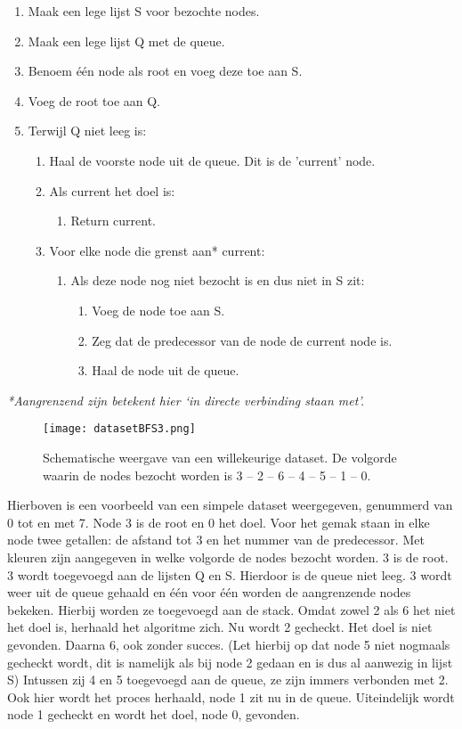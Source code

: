 \begin{enumerate}
\item Maak een lege lijst S voor bezochte nodes.
\item Maak een lege lijst Q met de queue.
\item Benoem één node als root en voeg deze toe aan S.
\item Voeg de root toe aan Q. 
\item Terwijl Q niet leeg is:
	\begin{enumerate}
	\item Haal de voorste node uit de queue. Dit is de 'current' node.
	\item Als current het doel is:
		\begin{enumerate}
		\item Return current.
		\end{enumerate}
	\item Voor elke node die grenst aan* current:
		\begin{enumerate}
		\item Als deze node nog niet bezocht is en dus niet in S zit:
			\begin{enumerate}
			\item Voeg de node toe aan S.
			\item Zeg dat de predecessor van de node de current node is.
			\item Haal de node uit de queue.
			\end{enumerate}
		\end{enumerate}
	\end{enumerate}
\end{enumerate}

\textit{*Aangrenzend zijn betekent hier `in directe verbinding staan met'.}

\begin{figure}[h]
  \centering
    \texttt{[image: datasetBFS3.png]}
  \caption{Schematische weergave van een willekeurige dataset. De volgorde waarin de nodes bezocht worden is 3 – 2 – 6 – 4 – 5 – 1 – 0.}
  \label{fig:datasetBFS3}
\end{figure}

Hierboven is een voorbeeld van een simpele dataset weergegeven, genummerd van 0 tot en met 7. Node 3 is de root en 0 het doel. Voor het gemak staan in elke node twee getallen: de afstand tot 3 en het nummer van de predecessor. Met kleuren zijn aangegeven in welke volgorde de nodes bezocht worden.
3 is de root. 3 wordt toegevoegd aan de lijsten Q en S. Hierdoor is de queue niet leeg. 3 wordt weer uit de queue gehaald en één voor één worden de aangrenzende nodes bekeken. Hierbij worden ze toegevoegd aan de stack. Omdat zowel 2 als 6 het niet het doel is, herhaald het algoritme zich. Nu wordt 2 gecheckt. Het doel is niet gevonden. Daarna 6, ook zonder succes. (Let hierbij op dat node 5 niet nogmaals gecheckt wordt, dit is namelijk als bij node 2 gedaan en is dus al aanwezig in lijst S) Intussen zij 4 en 5 toegevoegd aan de queue, ze zijn immers verbonden met 2. Ook hier wordt het proces herhaald, node 1 zit nu in de queue. Uiteindelijk wordt node 1 gecheckt en wordt het doel, node 0, gevonden.

